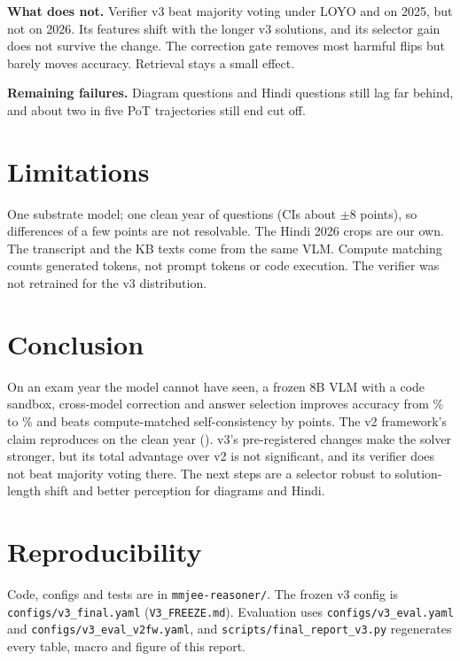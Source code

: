 \documentclass[conference]{IEEEtran}
\begin{document}
\textbf{What does not.} Verifier v3 beat majority voting under LOYO and on 2025, but not on 2026.
Its features shift with the longer v3 solutions, and its selector gain does not survive the
change. The correction gate removes most harmful flips but barely moves accuracy. Retrieval stays
a small effect.

\textbf{Remaining failures.} Diagram questions and Hindi questions still lag far behind, and
about two in five PoT trajectories still end cut off.

\section{Limitations}
One substrate model; one clean year of \NTest{} questions (CIs about $\pm$8 points), so
differences of a few points are not resolvable. The Hindi 2026 crops are our own. The transcript
and the KB texts come from the same VLM. Compute matching counts generated tokens, not prompt
tokens or code execution. The verifier was not retrained for the v3 distribution.

\section{Conclusion}
On an exam year the model cannot have seen, a frozen 8B VLM with a code sandbox, cross-model
correction and answer selection improves accuracy from \ThreeBase\% to \ThreeAcc\% and beats
compute-matched self-consistency by \ThreeVsSc{} points. The v2 framework's claim reproduces on
the clean year (\TwoVsSc). v3's pre-registered changes make the solver stronger, but its total
advantage over v2 is not significant, and its verifier does not beat majority voting there. The
next steps are a selector robust to solution-length shift and better perception for diagrams and
Hindi.

\section*{Reproducibility}
Code, configs and tests are in \texttt{mmjee-reasoner/}. The frozen v3 config is
\texttt{configs/v3\_final.yaml} (\texttt{V3\_FREEZE.md}). Evaluation uses
\texttt{configs/v3\_eval.yaml} and \texttt{configs/v3\_eval\_v2fw.yaml}, and
\texttt{scripts/final\_report\_v3.py} regenerates every table, macro and figure of this report.
\end{document}
